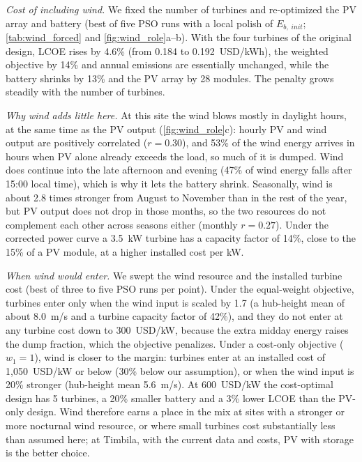 \documentclass[final,3p,times]{elsarticle}
\begin{document}
\textit{Cost of including wind.} We fixed the number of turbines and re-optimized the PV array and battery (best of five PSO runs with a local polish of $E_{b,\;init}$; \cref{tab:wind_forced} and \cref{fig:wind_role}a--b). With the four turbines of the original design, LCOE rises by 4.6\% (from 0.184 to 0.192~USD/kWh), the weighted objective by 14\% and annual emissions are essentially unchanged, while the battery shrinks by 13\% and the PV array by 28 modules. The penalty grows steadily with the number of turbines.

\textit{Why wind adds little here.} At this site the wind blows mostly in daylight hours, at the same time as the PV output (\cref{fig:wind_role}c): hourly PV and wind output are positively correlated ($r = 0.30$), and 53\% of the wind energy arrives in hours when PV alone already exceeds the load, so much of it is dumped. Wind does continue into the late afternoon and evening (47\% of wind energy falls after 15:00 local time), which is why it lets the battery shrink. Seasonally, wind is about 2.8 times stronger from August to November than in the rest of the year, but PV output does not drop in those months, so the two resources do not complement each other across seasons either (monthly $r = 0.27$). Under the corrected power curve a 3.5~kW turbine has a capacity factor of 14\%, close to the 15\% of a PV module, at a higher installed cost per kW.

\textit{When wind would enter.} We swept the wind resource and the installed turbine cost (best of three to five PSO runs per point). Under the equal-weight objective, turbines enter only when the wind input is scaled by 1.7 (a hub-height mean of about 8.0~m/s and a turbine capacity factor of 42\%), and they do not enter at any turbine cost down to 300~USD/kW, because the extra midday energy raises the dump fraction, which the objective penalizes. Under a cost-only objective ($w_1 = 1$), wind is closer to the margin: turbines enter at an installed cost of 1,050~USD/kW or below (30\% below our assumption), or when the wind input is 20\% stronger (hub-height mean 5.6~m/s). At 600~USD/kW the cost-optimal design has 5 turbines, a 20\% smaller battery and a 3\% lower LCOE than the PV-only design. Wind therefore earns a place in the mix at sites with a stronger or more nocturnal wind resource, or where small turbines cost substantially less than assumed here; at Timbila, with the current data and costs, PV with storage is the better choice.
\end{document}
